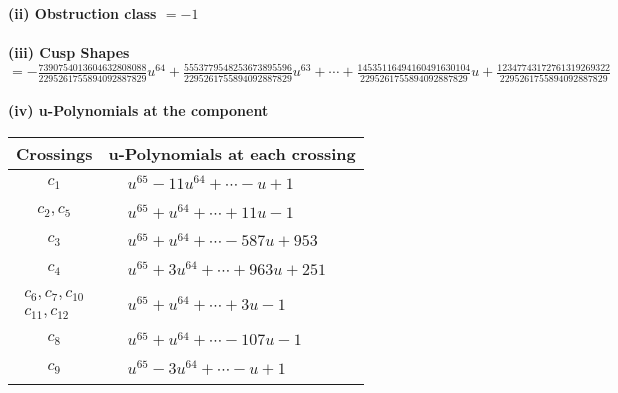 \documentclass[1p]{elsarticle_modified}
\theoremstyle{definition}
\begin{document}
\flushleft \textbf{(ii) Obstruction class $= -1$}\\~\\
\flushleft \textbf{(iii) Cusp Shapes $= -\frac{7390754013604632808088}{2295261755894092887829} u^{64}+\frac{5553779548253673895596}{2295261755894092887829} u^{63}+\cdots+\frac{14535116494160491630104}{2295261755894092887829} u+\frac{12347743172761319269322}{2295261755894092887829}$}\\~\\
\newpage\renewcommand{\arraystretch}{1}
\flushleft \textbf{(iv) u-Polynomials at the component}\newline \\
\begin{tabular}{m{50pt}|m{274pt}}
Crossings & \hspace{64pt}u-Polynomials at each crossing \\
\hline $$\begin{aligned}c_{1}\end{aligned}$$&$\begin{aligned}
&u^{65}-11 u^{64}+\cdots- u+1
\end{aligned}$\\
\hline $$\begin{aligned}c_{2},c_{5}\end{aligned}$$&$\begin{aligned}
&u^{65}+u^{64}+\cdots+11 u-1
\end{aligned}$\\
\hline $$\begin{aligned}c_{3}\end{aligned}$$&$\begin{aligned}
&u^{65}+u^{64}+\cdots-587 u+953
\end{aligned}$\\
\hline $$\begin{aligned}c_{4}\end{aligned}$$&$\begin{aligned}
&u^{65}+3 u^{64}+\cdots+963 u+251
\end{aligned}$\\
\hline $$\begin{aligned}c_{6},c_{7},c_{10}\\c_{11},c_{12}\end{aligned}$$&$\begin{aligned}
&u^{65}+u^{64}+\cdots+3 u-1
\end{aligned}$\\
\hline $$\begin{aligned}c_{8}\end{aligned}$$&$\begin{aligned}
&u^{65}+u^{64}+\cdots-107 u-1
\end{aligned}$\\
\hline $$\begin{aligned}c_{9}\end{aligned}$$&$\begin{aligned}
&u^{65}-3 u^{64}+\cdots- u+1
\end{aligned}$\\
\hline
\end{tabular}\\~\\
\end{document}
